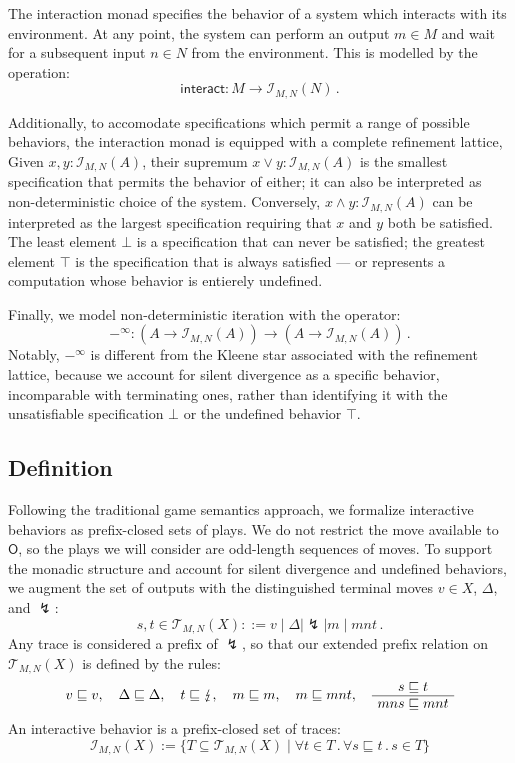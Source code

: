 \documentclass{article}
\newcommand{\kw}[1]{\ensuremath{ \mathsf{#1} }}
\begin{document}
The interaction monad specifies
the behavior of a system which interacts with its environment.
At any point,
the system can perform an output $m \in M$ and
wait for a subsequent input $n \in N$ from the environment.
This is modelled by the operation:
\[
    \kw{interact} : M \rightarrow \mathcal{I}_{M,N}(N) \,.
\]

Additionally,
to accomodate specifications which permit a range of possible behaviors,
the interaction monad is equipped with a complete refinement lattice,
Given $x, y : \mathcal{I}_{M,N}(A)$,
their supremum $x \vee y : \mathcal{I}_{M,N}(A)$
is the smallest specification that permits the behavior of either;
it can also be interpreted as non-deterministic choice
of the system.
Conversely, $x \wedge y : \mathcal{I}_{M,N}(A)$ can be interpreted as
the largest specification requiring that $x$ and $y$ both be satisfied.
The least element $\bot$
is a specification that can never be satisfied;
the greatest element $\top$
is the specification that is always satisfied ---
or represents a computation whose behavior is entierely undefined.

Finally,
we model non-deterministic iteration with the operator:
\[
     -^\infty : (A \rightarrow \mathcal{I}_{M,N}(A)) \rightarrow
                (A \rightarrow \mathcal{I}_{M,N}(A)) \,.
\]
Notably,
$-^\infty$ is different from
the Kleene star associated with the refinement lattice,
because we account for silent divergence as a specific behavior,
incomparable with terminating ones,
rather than identifying it with
the unsatisfiable specification $\bot$
or the undefined behavior $\top$.


\subsection{Definition} \label{sec:monad:def} %

Following the traditional game semantics approach,
we formalize interactive behaviors as prefix-closed sets of plays.
We do not restrict the move available to $\kw{O}$,
so the plays we will consider are odd-length sequences of moves.
To support the monadic structure and account
for silent divergence and undefined behaviors,
we augment the set of outputs with the
distinguished terminal moves $v \in X$, $\Delta$, and $\lightning$:
\[
    s, t \in
    \mathcal{T}_{M,N}(X) ::=
    v \mid \Delta \mid \lightning \mid m \mid mnt \,.
\]
Any trace is considered a prefix of $\lightning$,
so that our extended prefix relation on $\mathcal{T}_{M,N}(X)$
is defined by the rules:
\begin{gather*}
  v \sqsubseteq v , \quad
  \Delta \sqsubseteq \Delta , \quad
  t \sqsubseteq \lightning , \quad
  m \sqsubseteq m , \quad
  m \sqsubseteq mnt ,
  \quad
  \AxiomC{$s \sqsubseteq t$}
  \UnaryInfC{$mns \sqsubseteq mnt$}
  \DisplayProof
\end{gather*}
An interactive behavior is
a prefix-closed set of traces:
\[
    \mathcal{I}_{M,N}(X) :=
    \{ T \subseteq \mathcal{T}_{M,N}(X) \mid
       \forall t \in T \,.\, \forall s \sqsubseteq t \,.\, s \in T \}
\]
\end{document}
